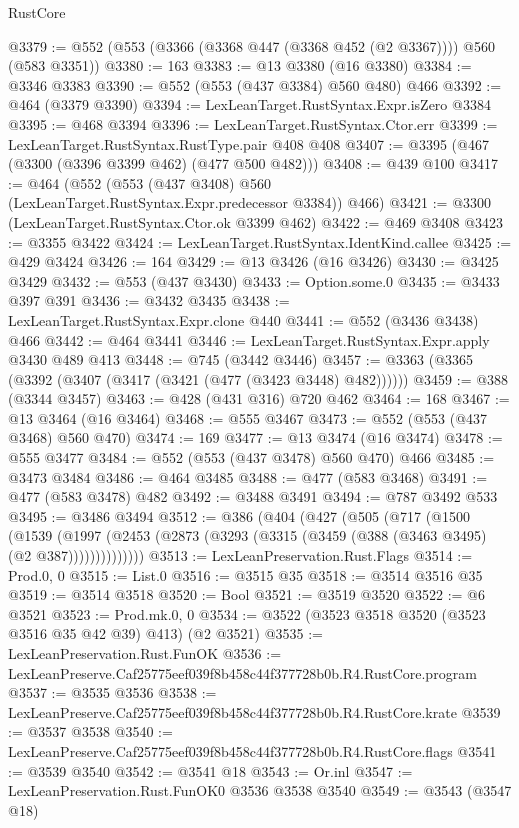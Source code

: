 \begin{lexlean}{RustCore}
\begin{coremodule}
@3379 := @552 (@553 (@3366 (@3368 @447 (@3368 @452 (@2 @3367)))) @560 (@583 @3351))
@3380 := 163
@3383 := @13 @3380 (@16 @3380)
@3384 := @3346 @3383
@3390 := @552 (@553 (@437 @3384) @560 @480) @466
@3392 := @464 (@3379 @3390)
@3394 := LexLeanTarget.RustSyntax.Expr.isZero @3384
@3395 := @468 @3394
@3396 := LexLeanTarget.RustSyntax.Ctor.err
@3399 := LexLeanTarget.RustSyntax.RustType.pair @408 @408
@3407 := @3395 (@467 (@3300 (@3396 @3399 @462) (@477 @500 @482)))
@3408 := @439 @100
@3417 := @464 (@552 (@553 (@437 @3408) @560 (LexLeanTarget.RustSyntax.Expr.predecessor @3384)) @466)
@3421 := @3300 (LexLeanTarget.RustSyntax.Ctor.ok @3399 @462)
@3422 := @469 @3408
@3423 := @3355 @3422
@3424 := LexLeanTarget.RustSyntax.IdentKind.callee
@3425 := @429 @3424
@3426 := 164
@3429 := @13 @3426 (@16 @3426)
@3430 := @3425 @3429
@3432 := @553 (@437 @3430)
@3433 := Option.some.{0}
@3435 := @3433 @397 @391
@3436 := @3432 @3435
@3438 := LexLeanTarget.RustSyntax.Expr.clone @440
@3441 := @552 (@3436 @3438) @466
@3442 := @464 @3441
@3446 := LexLeanTarget.RustSyntax.Expr.apply @3430 @489 @413
@3448 := @745 (@3442 @3446)
@3457 := @3363 (@3365 (@3392 (@3407 (@3417 (@3421 (@477 (@3423 @3448) @482))))))
@3459 := @388 (@3344 @3457)
@3463 := @428 (@431 @316) @720 @462
@3464 := 168
@3467 := @13 @3464 (@16 @3464)
@3468 := @555 @3467
@3473 := @552 (@553 (@437 @3468) @560 @470)
@3474 := 169
@3477 := @13 @3474 (@16 @3474)
@3478 := @555 @3477
@3484 := @552 (@553 (@437 @3478) @560 @470) @466
@3485 := @3473 @3484
@3486 := @464 @3485
@3488 := @477 (@583 @3468)
@3491 := @477 (@583 @3478) @482
@3492 := @3488 @3491
@3494 := @787 @3492 @533
@3495 := @3486 @3494
@3512 := @386
    (@404
      (@427
        (@505
          (@717
            (@1500
              (@1539
                (@1997 (@2453 (@2873 (@3293 (@3315 (@3459 (@388 (@3463 @3495) (@2 @387))))))))))))))
@3513 := LexLeanPreservation.Rust.Flags
@3514 := Prod.{0, 0}
@3515 := List.{0}
@3516 := @3515 @35
@3518 := @3514 @3516 @35
@3519 := @3514 @3518
@3520 := Bool
@3521 := @3519 @3520
@3522 := @6 @3521
@3523 := Prod.mk.{0, 0}
@3534 := @3522 (@3523 @3518 @3520 (@3523 @3516 @35 @42 @39) @413) (@2 @3521)
@3535 := LexLeanPreservation.Rust.FunOK
@3536 := LexLeanPreserve.Caf25775eef039f8b458c44f377728b0b.R4.RustCore.program
@3537 := @3535 @3536
@3538 := LexLeanPreserve.Caf25775eef039f8b458c44f377728b0b.R4.RustCore.krate
@3539 := @3537 @3538
@3540 := LexLeanPreserve.Caf25775eef039f8b458c44f377728b0b.R4.RustCore.flags
@3541 := @3539 @3540
@3542 := @3541 @18
@3543 := Or.inl
@3547 := LexLeanPreservation.Rust.FunOK0 @3536 @3538 @3540
@3549 := @3543 (@3547 @18)

\end{coremodule}
\end{lexlean}
